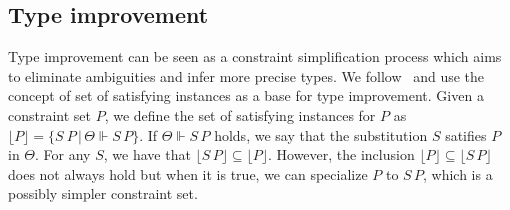 \documentclass[a4paper, 11pt]{article}
\theoremstyle{definition}
\begin{document}
\subsection{Type improvement}

Type improvement can be seen as a constraint simplification
process which aims to eliminate ambiguities and infer more
precise types. We follow~\cite{Jones1995} and use the concept
of set of satisfying instances as a base for type improvement.
Given a constraint set $P$, we define the set of satisfying
instances for $P$ as $\lfloor P \rfloor = \{S\:P\,|\,\Theta\Vdash S\,P\}$.
If $\Theta\Vdash S\,P$ holds, we say that the substitution $S$
satifies $P$ in $\Theta$. For any $S$, we have that
$\lfloor S\,P\rfloor \subseteq\lfloor P \rfloor$. However, the
inclusion $\lfloor P \rfloor \subseteq \lfloor S\,P\rfloor$ does not
always hold but when it is true, we can  specialize
$P$ to $S\,P$, which is a possibly simpler constraint set.



\end{document}
